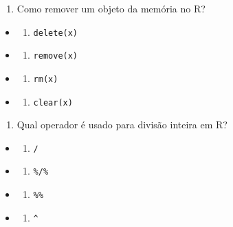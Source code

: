 \documentclass[
]{book}
\providecommand{\tightlist}{%
  \setlength{\itemsep}{0pt}\setlength{\parskip}{0pt}}
\begin{document}
\begin{enumerate}
\def\labelenumi{\arabic{enumi}.}
\setcounter{enumi}{5}
\tightlist
\item
  Como remover um objeto da memória no R?
\end{enumerate}

\begin{itemize}
\tightlist
\item
  \begin{enumerate}
  \def\labelenumi{\alph{enumi})}
  \tightlist
  \item
    \texttt{delete(x)}
  \end{enumerate}
\item
  \begin{enumerate}
  \def\labelenumi{\alph{enumi})}
  \setcounter{enumi}{1}
  \tightlist
  \item
    \texttt{remove(x)}
  \end{enumerate}
\item
  \begin{enumerate}
  \def\labelenumi{\alph{enumi})}
  \setcounter{enumi}{2}
  \tightlist
  \item
    \texttt{rm(x)}
  \end{enumerate}
\item
  \begin{enumerate}
  \def\labelenumi{\alph{enumi})}
  \setcounter{enumi}{3}
  \tightlist
  \item
    \texttt{clear(x)}
  \end{enumerate}
\end{itemize}

\begin{enumerate}
\def\labelenumi{\arabic{enumi}.}
\setcounter{enumi}{6}
\tightlist
\item
  Qual operador é usado para divisão inteira em R?
\end{enumerate}

\begin{itemize}
\tightlist
\item
  \begin{enumerate}
  \def\labelenumi{\alph{enumi})}
  \tightlist
  \item
    \texttt{/}
  \end{enumerate}
\item
  \begin{enumerate}
  \def\labelenumi{\alph{enumi})}
  \setcounter{enumi}{1}
  \tightlist
  \item
    \texttt{\%/\%}
  \end{enumerate}
\item
  \begin{enumerate}
  \def\labelenumi{\alph{enumi})}
  \setcounter{enumi}{2}
  \tightlist
  \item
    \texttt{\%\%}
  \end{enumerate}
\item
  \begin{enumerate}
  \def\labelenumi{\alph{enumi})}
  \setcounter{enumi}{3}
  \tightlist
  \item
    \texttt{\^{}}
  \end{enumerate}
\end{itemize}
\end{document}
